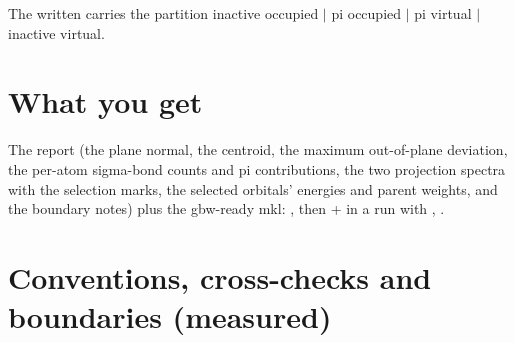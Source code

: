 The written  carries the partition
inactive occupied $|$ pi occupied $|$ pi virtual $|$ inactive virtual.

\section{What you get}

The report  (the plane normal, the centroid,
the maximum out-of-plane deviation, the per-atom sigma-bond counts and pi
contributions, the two projection spectra with the selection marks, the
selected orbitals' energies and parent weights, and the boundary notes)
plus the gbw-ready mkl: , then 
+  in a  run with ,
.

\section{Conventions, cross-checks and boundaries (measured)}

